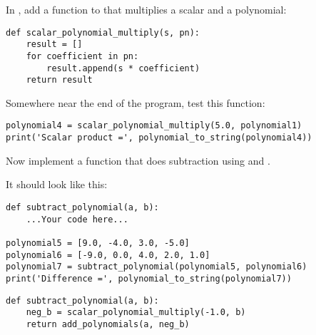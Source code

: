 In , add a function to that multiplies a scalar and a polynomial:
\begin{Verbatim}
def scalar_polynomial_multiply(s, pn):
    result = []
    for coefficient in pn:
        result.append(s * coefficient)
    return result
\end{Verbatim}

Somewhere near the end of the program, test this function:
\begin{Verbatim}
polynomial4 = scalar_polynomial_multiply(5.0, polynomial1)
print('Scalar product =', polynomial_to_string(polynomial4))
\end{Verbatim}

\begin{Exercise}[title=Subtract polynomials in Python, label=pysubpoly]
Now implement a function that does subtraction using
 and
.

It should look like this:
\begin{Verbatim}
def subtract_polynomial(a, b):
    ...Your code here...

polynomial5 = [9.0, -4.0, 3.0, -5.0]
polynomial6 = [-9.0, 0.0, 4.0, 2.0, 1.0]
polynomial7 = subtract_polynomial(polynomial5, polynomial6)
print('Difference =', polynomial_to_string(polynomial7))
\end{Verbatim}
\end{Exercise}
\begin{Answer}[ref=pysubpoly]
\begin{Verbatim}
def subtract_polynomial(a, b):
    neg_b = scalar_polynomial_multiply(-1.0, b)
    return add_polynomials(a, neg_b)
\end{Verbatim}
\end{Answer}


    
